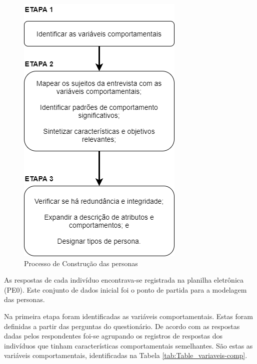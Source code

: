 \begin{figure}[htbp]
	\centering
	\includegraphics[keepaspectratio=true,scale=0.6]{figuras/metodologia/construct_persona.png}
	\caption{Processo de Construção das personas}
	\label{Fig:construct_persona.png}
\end{figure}


As respostas de cada indivíduo encontrava-se registrada na planilha eletrônica (PE0). Este conjunto de dados inicial foi o ponto de partida para a modelagem das personas.

Na primeira etapa foram identificadas as variáveis comportamentais. Estas foram definidas a partir das perguntas do questionário. De acordo com as respostas dadas pelos respondentes foi-se agrupando os registros de respostas dos indivíduos que tinham características comportamentais semelhantes. São estas as variáveis comportamentais, identificadas na Tabela \ref{tab:Table_variaveis-comp}.



